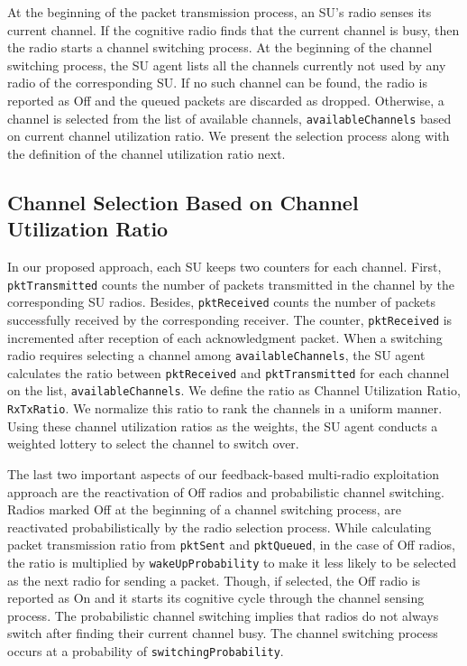 \documentclass[letterpaper,conference]{IEEEtran}
\begin{document}
At the beginning of the packet transmission process, an SU's radio senses its current channel. If the cognitive radio finds that the current channel is busy, then the radio starts a channel switching process. At the beginning of the channel switching process, the SU agent lists all the channels currently not used by any radio of the corresponding SU. If no such channel can be found, the radio is reported as Off and the queued packets are discarded as dropped. Otherwise, a channel is selected from the list of available channels, \texttt{availableChannels} based on current channel utilization ratio. We present the selection process along with the definition of the channel utilization ratio next.

\subsection{Channel Selection Based on Channel Utilization Ratio}
\label{subsec:channelSelect}

In our proposed approach, each SU keeps two counters for each channel. First, \texttt{pktTransmitted} counts the number of packets transmitted in the channel by the corresponding SU radios. Besides, \texttt{pktReceived} counts the number of packets successfully received by the corresponding receiver. The counter, \texttt{pktReceived} is incremented after reception of each acknowledgment packet. When a switching radio requires selecting a channel among \texttt{availableChannels}, the SU agent calculates the ratio between \texttt{pktReceived} and \texttt{pktTransmitted} for each channel on the list, \texttt{availableChannels}. We define the ratio as Channel Utilization Ratio, \texttt{RxTxRatio}. We normalize this ratio to rank the channels in a uniform manner. Using these channel utilization ratios as the weights, the SU agent conducts a weighted lottery to select the channel to switch over.

The last two important aspects of our feedback-based multi-radio exploitation approach are the reactivation of Off radios and probabilistic channel switching. Radios marked Off at the beginning of a channel switching process, are reactivated probabilistically by the radio selection process. While calculating packet transmission ratio from \texttt{pktSent} and \texttt{pktQueued}, in the case of Off radios, the ratio is multiplied by \texttt{wakeUpProbability} to make it less likely to be selected as the next radio for sending a packet. Though, if selected, the Off radio is reported as On and it starts its cognitive cycle through the channel sensing process. The probabilistic channel switching implies that radios do not always switch after finding their current channel busy. The channel switching process occurs at a probability of \texttt{switchingProbability}.
\end{document}
